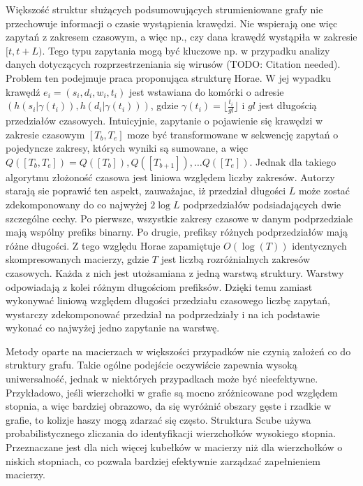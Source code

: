     Większość struktur służących podsumowujących strumieniowane grafy nie przechowuje informacji o czasie wystąpienia krawędzi. Nie wspierają one więc zapytań z zakresem czasowym, a więc np., czy dana krawędź wystąpiła w zakresie $[t, t + L)$. Tego typu zapytania mogą być kluczowe np. w przypadku analizy danych dotyczących rozprzestrzeniania się wirusów (TODO: Citation needed). Problem ten podejmuje praca proponująca strukturę Horae\cite{Chen_Zhou_Chen_Xiao_Jin_Li_2022}. W jej wypadku krawędź $e_i = (s_i, d_i, w_i, t_i)$ jest wstawiana do komórki o adresie $(h(s_i | \gamma(t_i)), h(d_i | \gamma(t_i)))$, gdzie $\gamma(t_i) = \lfloor \frac{t_i}{gl} \rfloor$ i $gl$ jest długością przedziałów czasowych. Intuicyjnie, zapytanie o pojawienie się krawędzi w zakresie czasowym $[T_b, T_e]$ moze być transformowane w sekwencję zapytań o pojedyncze zakresy, których wyniki są sumowane, a więc $Q([T_b, T_e]) = Q([T_b]), Q([T_{b+1}]), \dots Q([T_e])$. Jednak dla takiego algorytmu złożoność czasowa jest liniowa względem liczby zakresów. Autorzy starają sie poprawić ten aspekt, zauważajac, iż przedział długości $L$ może zostać zdekomponowany do co najwyżej $2\log{L}$ podprzedziałów podsiadających dwie szczególne cechy. Po pierwsze, wszystkie zakresy czasowe w danym podprzedziale mają wspólny prefiks binarny. Po drugie, prefiksy różnych podprzedziałów mają różne długości. Z tego względu Horae zapamiętuje $O(\log(T))$ identycznych skompresowanych macierzy, gdzie $T$ jest liczbą rozróżnialnych zakresów czasowych. Każda z nich jest utożsamiana z jedną warstwą struktury. Warstwy odpowiadają z kolei różnym długościom prefiksów. Dzięki temu zamiast wykonywać liniową względem długości przedziału czasowego liczbę zapytań, wystarczy zdekomponować przedział na podprzedziały i na ich podstawie wykonać co najwyżej jedno zapytanie na warstwę. 
    
    Metody oparte na macierzach w większości przypadków nie czynią założeń co do struktury grafu. Takie ogólne podejście oczywiście zapewnia wysoką uniwersalność, jednak w niektórych przypadkach może być nieefektywne. Przykładowo, jeśli wierzchołki w grafie są mocno zróżnicowane pod względem stopnia, a więc bardziej obrazowo, da się wyróżnić obszary gęste i rzadkie w grafie, to kolizje haszy mogą zdarzać się często. Struktura Scube\cite{Chen_Zhou_Chen_Jin_2022} używa probabilistycznego zliczania do identyfikacji wierzchołków wysokiego stopnia. Przeznaczane jest dla nich więcej kubełków w macierzy niż dla wierzchołków o niskich stopniach, co pozwala bardziej efektywnie zarządzać zapełnieniem macierzy. 

